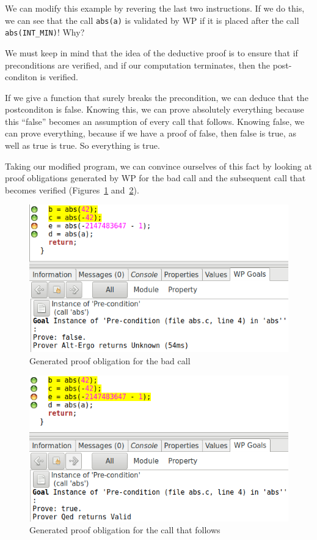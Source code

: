 \documentclass[12pt,francais,]{scrbook}
\begin{document}
We can modify this example by revering the last two instructions. If we
do this, we can see that the call \texttt{abs(a)} is validated by WP if
it is placed after the call \texttt{abs(INT\_MIN)}! Why?

We must keep in mind that the idea of the deductive proof is to ensure
that if preconditions are verified, and if our computation terminates,
then the post-conditon is verified.

If we give a function that surely breaks the precondition, we can deduce
that the postconditon is false. Knowing this, we can prove absolutely
everything because this ``false'' becomes an assumption of every call
that follows. Knowing false, we can prove everything, because if we have
a proof of false, then false is true, as well as true is true. So
everything is true.

Taking our modified program, we can convince ourselves of this fact by
looking at proof obligations generated by WP for the bad call and the
subsequent call that becomes verified (Figures~\ref{fig:2-1-2-foo-2}
and~\ref{fig:2-1-2-foo-3}).

\begin{figure}[htbp]
\centering
\includegraphics[scale=0.5]{2-1-2-foo-2.png}
\caption{Generated proof obligation for the bad call}
\label{fig:2-1-2-foo-2}
\end{figure}

\begin{figure}[htbp]
\centering
\includegraphics[scale=0.5]{2-1-2-foo-3.png}
\caption{Generated proof obligation for the call that follows}
\label{fig:2-1-2-foo-3}
\end{figure}
\end{document}
